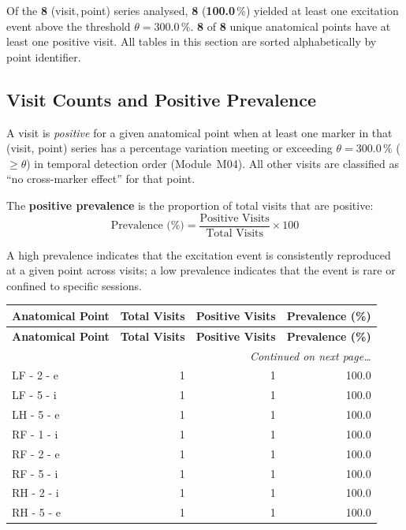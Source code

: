 \documentclass[a4paper,11pt]{article}
\begin{document}
\noindent
Of the \textbf{8} (visit,\,point) series analysed,
\textbf{8} (\textbf{100.0}\,\%) yielded at least one
excitation event above the threshold $\theta = 300.0\,\%$.
\textbf{8} of \textbf{8} unique anatomical points
have at least one positive visit.
All tables in this section are sorted alphabetically by point identifier.

\subsection{Visit Counts and Positive Prevalence}

A visit is \emph{positive} for a given anatomical point when at least one marker in that
(visit, point) series has a percentage variation meeting or exceeding
$\theta = 300.0\,\%$ ($\geq \theta$) in temporal detection order (Module~M04).
All other visits are classified as ``no cross-marker effect'' for that point.

The \textbf{positive prevalence} is the proportion of total visits that are positive:
\[
  \text{Prevalence (\%)} = \frac{\text{Positive Visits}}{\text{Total Visits}} \times 100
\]

A high prevalence indicates that the excitation event is consistently reproduced at a given
point across visits; a low prevalence indicates that the event is rare or confined to
specific sessions.

\begin{small}
\begin{longtable}{p{5cm}rrr}
\toprule
\textbf{Anatomical Point} &
\textbf{Total Visits} &
\textbf{Positive Visits} &
\textbf{Prevalence (\%)} \\
\midrule
\endfirsthead
\toprule
\textbf{Anatomical Point} &
\textbf{Total Visits} &
\textbf{Positive Visits} &
\textbf{Prevalence (\%)} \\
\midrule
\endhead
\midrule
\multicolumn{4}{r}{\small\emph{Continued on next page\ldots}} \\
\endfoot
\bottomrule
\endlastfoot
LF - 2 - e & 1 & 1 & 100.0 \\
LF - 5 - i & 1 & 1 & 100.0 \\
LH - 5 - e & 1 & 1 & 100.0 \\
RF - 1 - i & 1 & 1 & 100.0 \\
RF - 2 - e & 1 & 1 & 100.0 \\
RF - 5 - i & 1 & 1 & 100.0 \\
RH - 2 - i & 1 & 1 & 100.0 \\
RH - 5 - e & 1 & 1 & 100.0 \\
\end{longtable}
\end{small}
\end{document}
